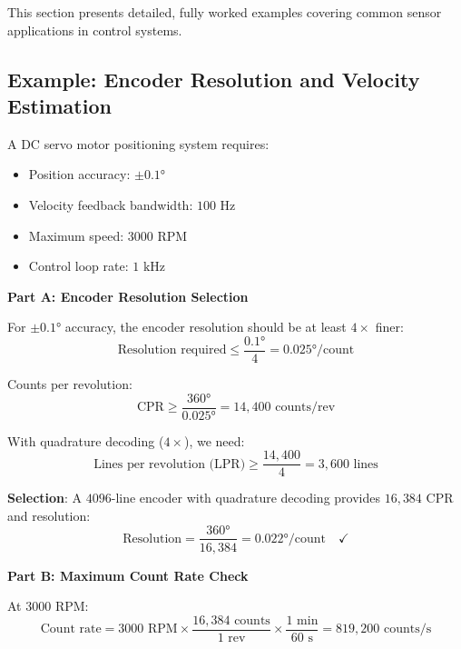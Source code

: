 This section presents detailed, fully worked examples covering common sensor applications in control systems.

\subsection{Example: Encoder Resolution and Velocity Estimation}
\label{ex:encoder_velocity}

\begin{example}

A DC servo motor positioning system requires:
\begin{itemize}
    \item Position accuracy: $\pm 0.1°$
    \item Velocity feedback bandwidth: $100\text{ Hz}$
    \item Maximum speed: $3000\text{ RPM}$
    \item Control loop rate: $1\text{ kHz}$
\end{itemize}

\textbf{Part A: Encoder Resolution Selection}

For $\pm 0.1°$ accuracy, the encoder resolution should be at least $4\times$ finer:
\begin{equation}
\text{Resolution required} \leq \frac{0.1°}{4} = 0.025°/\text{count}
\end{equation}

Counts per revolution:
\begin{equation}
\text{CPR} \geq \frac{360°}{0.025°} = 14{,}400\text{ counts/rev}
\end{equation}

With quadrature decoding ($4\times$), we need:
\begin{equation}
\text{Lines per revolution (LPR)} \geq \frac{14{,}400}{4} = 3{,}600\text{ lines}
\end{equation}

\textbf{Selection}: A $4096$-line encoder with quadrature decoding provides $16{,}384\text{ CPR}$ and resolution:
\begin{equation}
\text{Resolution} = \frac{360°}{16{,}384} = 0.022°/\text{count} \quad \checkmark
\end{equation}

\textbf{Part B: Maximum Count Rate Check}

At $3000\text{ RPM}$:
\begin{equation}
\text{Count rate} = 3000\text{ RPM} \times \frac{16{,}384\text{ counts}}{1\text{ rev}} \times \frac{1\text{ min}}{60\text{ s}} = 819{,}200\text{ counts/s}
\end{equation}


\end{example}
